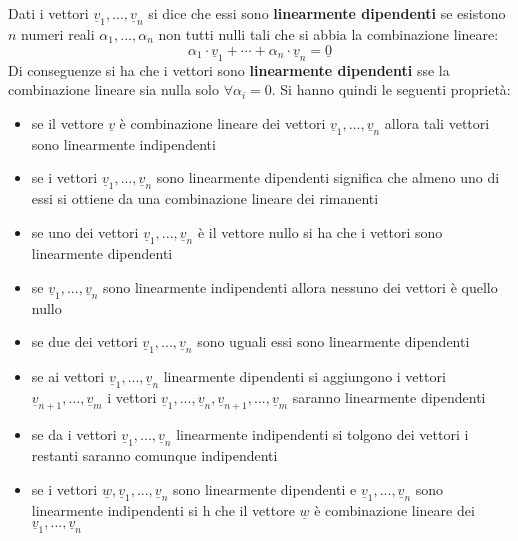 \documentclass[a4paper,12pt, oneside]{book}
\begin{document}
\begin{definizione}
Dati i vettori $\underline{v}_1,...,\underline{v}_n$ si dice che essi sono \textbf{linearmente dipendenti} se esistono $n$ numeri reali $\alpha_1,...,\alpha_n$ non tutti nulli tali che si abbia la combinazione lineare:
$$\alpha_1\cdot \underline{v}_1+\cdots+\alpha_n\cdot \underline{v}_n=\underline{0}$$
Di conseguenze si ha che i vettori sono \textbf{linearmente dipendenti} sse la combinazione lineare sia nulla solo $\forall \alpha_i=0$.\newpage
Si hanno quindi le seguenti proprietà:
\begin{itemize}
\item se il vettore $\underline{v}$ è combinazione lineare dei vettori $\underline{v}_1,...,\underline{v}_n$  allora tali vettori sono linearmente indipendenti
\item se i vettori $\underline{v}_1,...,\underline{v}_n$  sono linearmente dipendenti significa che almeno uno di essi si ottiene da una combinazione lineare dei rimanenti
\item se uno dei vettori $\underline{v}_1,...,\underline{v}_n$  è il vettore nullo si ha che i vettori sono linearmente dipendenti
\item se $\underline{v}_1,...,\underline{v}_n$  sono linearmente indipendenti allora nessuno dei vettori è quello nullo
\item se due dei vettori $\underline{v}_1,...,\underline{v}_n$  sono uguali essi sono linearmente dipendenti
\item se ai vettori $\underline{v}_1,...,\underline{v}_n$ linearmente dipendenti si aggiungono i vettori $\underline{v}_{n+1},...,\underline{v}_m$ i vettori $\underline{v}_1,...,\underline{v}_n,\underline{v}_{n+1},...,\underline{v}_m$  saranno linearmente dipendenti
\item se da i vettori $\underline{v}_1,...,\underline{v}_n$  linearmente indipendenti si tolgono dei vettori i restanti saranno comunque indipendenti
\item se i vettori $\underline{w},\underline{v}_1,...,\underline{v}_n$ sono linearmente dipendenti e $\underline{v}_1,...,\underline{v}_n$ sono linearmente indipendenti si h che il vettore $\underline{w}$ è combinazione lineare dei $\underline{v}_1,...,\underline{v}_n$ 
\end{itemize}
\end{definizione}
\end{document}
